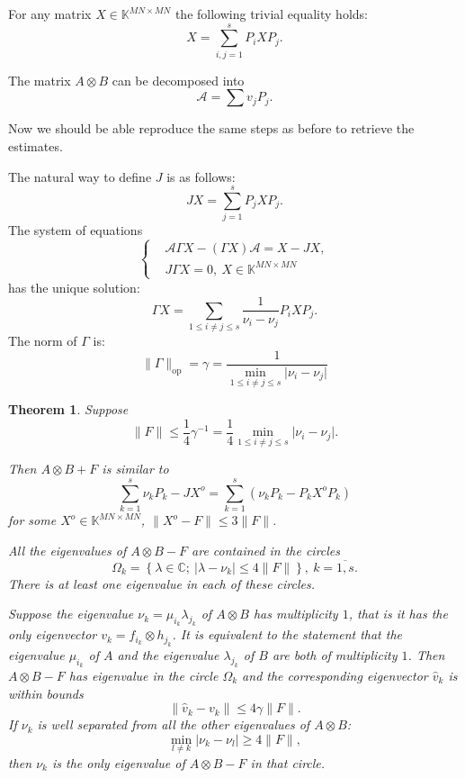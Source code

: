\documentclass[a4paper]{jpconf}
\newtheorem{nkjpcsthm}{Theorem}
\begin{document}
For any matrix \( X\in \mathbb{K}^{MN{\times}MN} \)
    the following trivial equality holds:
    \[
        X = \sum_{i,j=1}^s P_i X P_j.
    \]

The matrix \( A\otimes B \) can be decomposed into
    \[
        \mathcal{A} = \sum v_j P_j.
    \]

Now we should be able reproduce the same steps as before
    to retrieve the estimates.

The natural way to define \( J \) is as follows:
    \[
        JX = \sum_{j=1}^s P_j X P_j.
    \]
The system of equations
    \[\left\{\begin{aligned}
        & \mathcal{A}\Gamma X - (\Gamma X) \mathcal{A} = X - JX, \\
        & J\Gamma X = 0,\ X\in \mathbb{K}^{MN{\times}MN}
    \end{aligned}\right.\]
    has the unique solution:
    \[
        \Gamma X = \sum_{1\leq i{\neq}j \leq s} \frac{1}{\nu_i-\nu_j} P_i X P_j.
    \]
    The norm of \( \Gamma \) is:
    \[
        \|\Gamma\|_{\mathrm{op}} = \gamma = \frac{1}{\min_{1\leq i{\neq}j\leq s}\lvert\nu_i - \nu_j\rvert}
    \]


\begin{nkjpcsthm}
    Suppose
    \[
        \|F\| \leq \frac14 \gamma^{-1} = \frac14 \min_{1\leq i{\neq}j\leq s}\lvert\nu_i - \nu_j\rvert.
    \]

    Then \( A{\otimes}B + F \) is similar to
    \[ \sum_{k=1}^s \nu_k P_k - JX^o = \sum_{k=1}^s (\nu_k P_k - P_k X^o P_k) \]
    for some \( X^o \in \mathbb{K}^{MN{\times}MN} \),
    \( \|X^o - F\|\leq 3\|F\| \).

    All the eigenvalues of \( A{\otimes}B - F \) are contained in the circles
    \[
        \Omega_k = \left\{
            \lambda\in\mathbb{C};
            \ \lvert\lambda - \nu_k\rvert \leq 4\|F\|
            \right\},
        \ k{=}\overline{1,s}.
    \]
    There is at least one eigenvalue in each of these circles.

    Suppose the eigenvalue \( \nu_k=\mu_{i_k}\lambda_{j_k} \) of \( A{\otimes}B \) has multiplicity \( 1 \),
        that is it has the only eigenvector \( v_k = f_{i_k}{\otimes}h_{j_k} \).
    It is equivalent to the statement that the eigenvalue \( \mu_{i_k} \)
        of \( A \) and the eigenvalue \( \lambda_{j_k} \) of \( B \)
        are both of multiplicity \( 1 \).
    Then \( A{\otimes}B - F \) has eigenvalue in the circle \( \Omega_k \)
        and the corresponding eigenvector \( \hat{v}_k \) is within bounds
    \[
        \|\hat{v}_k - v_k\| \leq 4\gamma \|F\|.
    \]
    If \( \nu_k \) is well separated from all the other eigenvalues of \( A{\otimes}B \):
    \[
        \min_{l\neq k}
        \lvert
        \nu_k - \nu_l
        \rvert
        \geq 4\|F\|,
    \]
    then \( \nu_k \) is the only eigenvalue of \( A{\otimes}B - F \)
    in that circle.
\end{nkjpcsthm}
\end{document}
